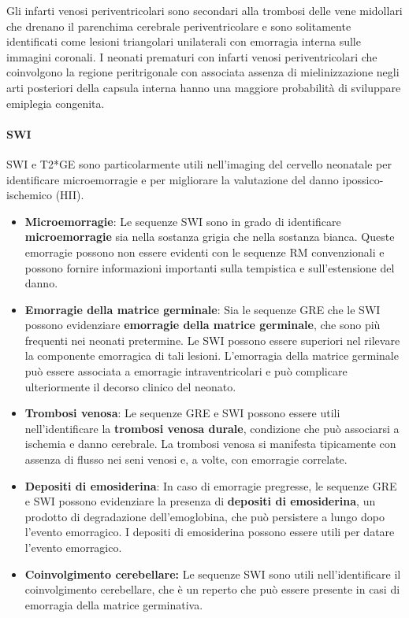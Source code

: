 
Gli infarti venosi periventricolari sono secondari alla trombosi delle vene midollari che drenano il parenchima cerebrale periventricolare e sono solitamente identificati come lesioni triangolari unilaterali con emorragia interna sulle immagini coronali. I neonati prematuri con infarti venosi periventricolari che coinvolgono la regione peritrigonale con associata assenza di mielinizzazione negli arti posteriori della capsula interna hanno una maggiore probabilità di sviluppare emiplegia congenita.

\paragraph{SWI} SWI e T2*GE sono particolarmente utili nell'imaging del cervello neonatale per identificare microemorragie e per migliorare la valutazione del danno ipossico-ischemico (HII).

\begin{itemize}
	\tightlist
	\item
	\textbf{Microemorragie}: Le sequenze SWI sono in grado di identificare \textbf{microemorragie} sia nella sostanza grigia che nella sostanza bianca. Queste emorragie possono non essere evidenti con le sequenze RM convenzionali e possono fornire informazioni importanti sulla tempistica e sull'estensione del danno.
	\item
	\textbf{Emorragie della matrice germinale}: Sia le sequenze GRE che le SWI possono evidenziare \textbf{emorragie della matrice germinale}, che sono più frequenti nei neonati pretermine. Le SWI possono essere superiori nel rilevare la componente emorragica di tali lesioni. L'emorragia della matrice germinale può essere associata a emorragie intraventricolari e può complicare ulteriormente il decorso clinico del neonato.
	\item
	\textbf{Trombosi venosa}: Le sequenze GRE e SWI possono essere utili nell'identificare la \textbf{trombosi venosa durale}, condizione che può associarsi a ischemia e danno cerebrale. La trombosi venosa si manifesta tipicamente con assenza di flusso nei seni venosi e, a volte, con emorragie correlate.
	\item
	\textbf{Depositi di emosiderina}: In caso di emorragie pregresse, le sequenze GRE e SWI possono evidenziare la presenza di \textbf{depositi di emosiderina}, un prodotto di degradazione dell'emoglobina, che può persistere a lungo dopo l'evento emorragico. I depositi di emosiderina possono essere utili per datare l'evento emorragico.
	\item
	\textbf{Coinvolgimento cerebellare:} Le sequenze SWI sono utili nell'identificare il coinvolgimento cerebellare, che è un reperto che può essere presente in casi di emorragia della matrice germinativa.
\end{itemize}

